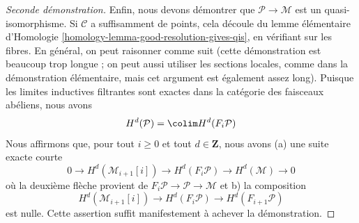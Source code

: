 \begin{proof}[Seconde démonstration]
\medskip\noindent
Enfin, nous devons démontrer que $\mathcal{P} \to \mathcal{M}$ est
un quasi-isomorphisme. Si $\mathcal{C}$ a suffisamment de points, cela
découle du lemme élémentaire d'Homologie
\ref{homology-lemma-good-resolution-gives-qis}, en vérifiant sur
les fibres. En général, on peut raisonner comme suit (cette
démonstration est beaucoup trop longue ; on peut aussi utiliser les sections
locales, comme dans la démonstration élémentaire, mais cet argument est
également assez long).
Puisque les limites inductives filtrantes sont exactes dans la catégorie des
faisceaux abéliens,
nous avons $$
H^d(\mathcal{P}) = \colim H^d(F_i\mathcal{P})
$$
Nous affirmons que, pour tout $i \geq 0$ et tout $d \in \mathbf{Z}$,
nous avons (a) une
suite exacte courte $$
0 \to H^d(\mathcal{M}_{i + 1}[i]) \to
H^d(F_i\mathcal{P}) \to H^d(\mathcal{M}) \to
0 $$
où la deuxième flèche
provient de $F_i\mathcal{P} \to \mathcal{P} \to \mathcal{M}$
et b) la composition
$$
H^d(\mathcal{M}_{i + 1}[i]) \to
H^d(F_i\mathcal{P}) \to
H^d(F_{i + 1}\mathcal{P})
$$ est
nulle. Cette assertion suffit manifestement à achever la démonstration.


\end{proof}
